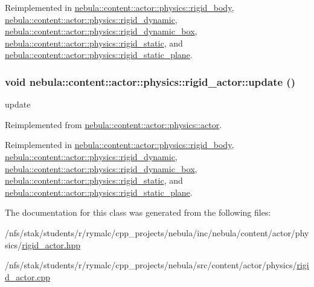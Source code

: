 Reimplemented in \hyperlink{classnebula_1_1content_1_1actor_1_1physics_1_1rigid__body_a480452963a16809aef9a8bd80bce1d16}{nebula::content::actor::physics::rigid\_\-body}, \hyperlink{classnebula_1_1content_1_1actor_1_1physics_1_1rigid__dynamic_a23e957b179440185cfc15750b47f3a5c}{nebula::content::actor::physics::rigid\_\-dynamic}, \hyperlink{classnebula_1_1content_1_1actor_1_1physics_1_1rigid__dynamic__box_a849dd1aec8bf8be223dc3d7d9c1f81b5}{nebula::content::actor::physics::rigid\_\-dynamic\_\-box}, \hyperlink{classnebula_1_1content_1_1actor_1_1physics_1_1rigid__static_a83be7bda449d94b5d7a69c8b8f99f6de}{nebula::content::actor::physics::rigid\_\-static}, and \hyperlink{classnebula_1_1content_1_1actor_1_1physics_1_1rigid__static__plane_aeb2d9144ad76f92c6170bbc5ad81c2d6}{nebula::content::actor::physics::rigid\_\-static\_\-plane}.\hypertarget{classnebula_1_1content_1_1actor_1_1physics_1_1rigid__actor_a9227091110aae435ca13493edd27fe66}{
\subsubsection[{update}]{\setlength{\rightskip}{0pt plus 5cm}void nebula::content::actor::physics::rigid\_\-actor::update ()}}
\label{classnebula_1_1content_1_1actor_1_1physics_1_1rigid__actor_a9227091110aae435ca13493edd27fe66}


update 

Reimplemented from \hyperlink{classnebula_1_1content_1_1actor_1_1physics_1_1actor_a7b7a1ee3673ad9f618a20e327e1a974c}{nebula::content::actor::physics::actor}.

Reimplemented in \hyperlink{classnebula_1_1content_1_1actor_1_1physics_1_1rigid__body_a7c8c0d4a581a36f3015912d1d73166f6}{nebula::content::actor::physics::rigid\_\-body}, \hyperlink{classnebula_1_1content_1_1actor_1_1physics_1_1rigid__dynamic_a37baf9ed4986782294789073ebb05f19}{nebula::content::actor::physics::rigid\_\-dynamic}, \hyperlink{classnebula_1_1content_1_1actor_1_1physics_1_1rigid__dynamic__box_ac3f90a5c975d090930fb77f5961e7064}{nebula::content::actor::physics::rigid\_\-dynamic\_\-box}, \hyperlink{classnebula_1_1content_1_1actor_1_1physics_1_1rigid__static_a8ecc4b9b308562ab3942bdac5b8ddfea}{nebula::content::actor::physics::rigid\_\-static}, and \hyperlink{classnebula_1_1content_1_1actor_1_1physics_1_1rigid__static__plane_ab42f682ba60457dc596613690b57517e}{nebula::content::actor::physics::rigid\_\-static\_\-plane}.

The documentation for this class was generated from the following files:\begin{DoxyCompactItemize}
\item 
/nfs/stak/students/r/rymalc/cpp\_\-projects/nebula/inc/nebula/content/actor/physics/\hyperlink{physics_2rigid__actor_8hpp}{rigid\_\-actor.hpp}\item 
/nfs/stak/students/r/rymalc/cpp\_\-projects/nebula/src/content/actor/physics/\hyperlink{physics_2rigid__actor_8cpp}{rigid\_\-actor.cpp}\end{DoxyCompactItemize}
